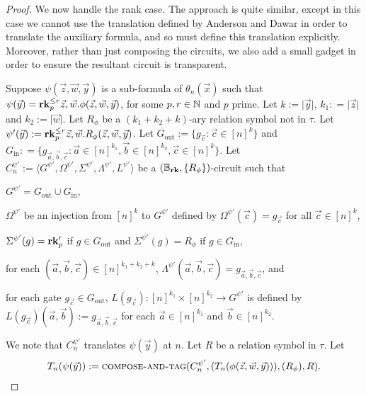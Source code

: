 \documentclass[../paper.tex]{subfiles}
\begin{document}
\begin{proof}
  We now handle the rank case. The approach is quite similar, except in this
  case we cannot use the translation defined by Anderson and Dawar in order to
  translate the auxiliary formula, and so must define this translation
  explicitly. Moreover, rather than just composing the circuits, we also add a
  small gadget in order to ensure the resultant circuit is transparent.
  
  Suppose $\psi(\vec{z}, \vec{w}, \vec{y})$ is a sub-formula of
  $\theta_n(\vec{x})$ such that $\psi (\vec{y}) = \text{\textbf{rk}}^{\leq r}_p \vec{z},
  \vec{w} .\phi(\vec{z}, \vec{w}, \vec{y})$, for some $p, r \in \mathbb{N}$ and $p$
  prime. Let $k:= \vert \vec{y} \vert$, $k_1 : = \vert \vec{z} \vert$ and $k_2
  := \vert \vec{w} \vert$. Let $R_\phi$ be a $(k_1 + k_2 + k)$-ary relation
  symbol not in $\tau$. Let $\psi'(\vec{y}) := \text{\textbf{rk}}^{\leq r}_p\vec{z}, \vec{w}.
  R_{\phi} (\vec{z}, \vec{w}, \vec{y})$. Let $G_{\text{out}} := \{g_{\vec{c}} :
  \vec{c} \in [n]^k\}$ and $G_{\text{in}} : = \{ g_{\vec{a}, \vec{b}, \vec{c}} :
  \vec{a} \in [n]^{k_1}, \vec{b} \in [n]^{k_2}, \vec{c} \in [n]^{k}\}$. Let
  $C^{\psi'}_n:= \langle G^{\psi'}, \Omega^{\psi'}, \Sigma^{\psi'},
  \Lambda^{\psi'}, L^{\psi'}\rangle$ be a $(\mathbb{B}_{\text{\textbf{rk}}}, \{ R_{\phi}
  \})$-circuit such that
  \begin{itemizens}
  \item $G^{\psi'} = G_{\text{out}} \cup G_{\text{in}}$,
  \item $\Omega^{\psi'}$ be an injection from $[n]^k$ to $G^{\psi'}$ defined by
    $\Omega^{\psi'}(\vec{c}) = g_{\vec{c}}$ for all $\vec{c} \in [n]^k$,
  \item $\Sigma^{\psi'} (g) = \text{\textbf{rk}}^r_p$ if $g \in G_{\text{out}}$ and
    $\Sigma^{\psi'}(g) = R_\phi$ if $g \in G_{\text{in}}$,
  \item for each $(\vec{a}, \vec{b}, \vec{c}) \in [n]^{k_1 +k_2 + k}$,
    $\Lambda^{\psi'} (\vec{a}, \vec{b}, \vec{c}) = g_{\vec{a}, \vec{b},
      \vec{c}}$, and
  \item for each gate $g_{\vec{c}} \in G_{\text{out}}$, $L(g_{\vec{c}}):
    [n]^{k_1} \times [n]^{k_2} \rightarrow G^{\psi'}$ is defined by
    $L(g_{\vec{c}})(\vec{a}, \vec{b}) := g_{\vec{a}, \vec{b}, \vec{c}}$ for each
    $\vec{a} \in [n]^{k_1}$ and $\vec{b} \in [n]^{k_2}$.
  \end{itemizens}

  We note that $C^{\psi'}_n$ translates $\psi (\vec{y})$ at $n$. Let $R$ be a
  relation symbol in $\tau$. Let
  \begin{align*} T_n(\psi(\vec{y})) := {\normalfont\textsc{compose-and-tag}}(C^{\psi'}_n,
    (T_n(\phi(\vec{z}, \vec{w}, \vec{y}))), (R_\phi), R).
  \end{align*}


\end{proof}
\end{document}
